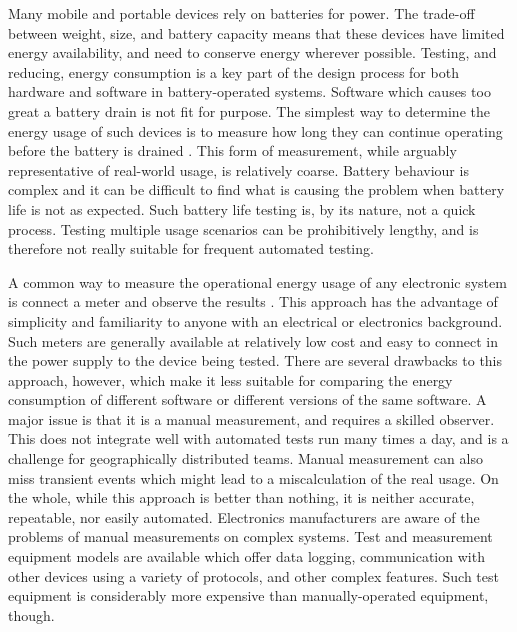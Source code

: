Many mobile and portable devices rely on batteries for power. The trade-off between weight, size, and battery capacity means that these devices  have limited energy availability, and need to conserve energy wherever possible. Testing, and reducing, energy consumption is a key part of the design process for both hardware and software in battery-operated systems. Software which causes too great a battery drain is not fit for purpose. The simplest way to determine the energy usage of such devices is to measure how long they can continue operating before the battery is drained \citep{Brown2006}. This form of measurement, while arguably representative of real-world usage, is relatively coarse. Battery behaviour is complex \citep{Panigrahi2001} and it can be difficult to find what is causing the problem when battery life is not as expected. Such battery life testing is, by its nature, not a quick process. Testing multiple usage scenarios can be prohibitively lengthy, and is therefore not really suitable for frequent automated testing.

A common way to measure the operational energy usage of any electronic system is connect a meter and observe the results \citep{derBauer2023}. This approach has the advantage of simplicity and familiarity to anyone with an electrical or electronics background. Such meters are generally available at relatively low cost and easy to connect in the power supply to the device being tested. There are several drawbacks to this approach, however, which make it less suitable for comparing the energy consumption of different software or different versions of the same software. A major issue is that it is a manual measurement, and requires a skilled observer. This does not integrate well with automated tests run many times a day, and is a challenge for geographically distributed teams. Manual measurement can also miss transient events which might lead to a miscalculation of the real usage. On the whole, while this approach is better than nothing, it is neither accurate, repeatable, nor easily automated. Electronics manufacturers are aware of the problems of manual measurements on complex systems. Test and measurement equipment models are available which offer data logging, communication with other devices using a variety of protocols, and other complex features. Such test equipment is considerably more expensive than manually-operated equipment, though. 

